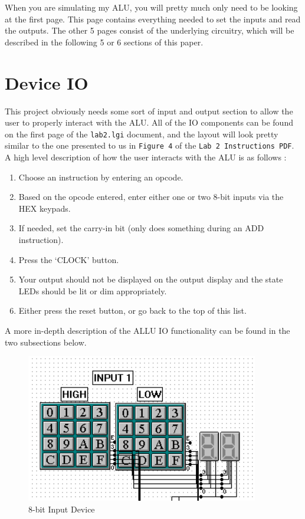 \documentclass[a4paper,11pt]{article}
\begin{document}
When you are simulating my ALU, you will pretty much only need to be looking at the first page. This page contains everything needed to set the inputs and read the outputs. The other 5 pages consist of the underlying circuitry, which will be described in the following 5 or 6 sections of this paper.

\section{Device IO}
This project obviously needs some sort of input and output section to allow the user to properly interact with the ALU. All of the IO components can be found on the first page of the \texttt{lab2.lgi} document, and the layout will look pretty similar to the one presented to us in \texttt{Figure 4} of the \texttt{Lab 2 Instructions PDF}. A high level description of how the user interacts with the ALU is as follows :
\begin{enumerate}
\item Choose an instruction by entering an opcode. 
\item Based on the opcode entered, enter either one or two 8-bit inputs via the HEX keypads. 
\item If needed, set the carry-in bit (only does something during an ADD instruction).
\item Press the `CLOCK' button. 
\item Your output should not be displayed on the output display and the state LEDs should be lit or dim appropriately.
\item Either press the reset button, or go back to the top of this list.
\end{enumerate}

A more in-depth description of the ALLU IO functionality can be found in the two subsections below.

  \begin{figure}
       \includegraphics[width=4in]{pictures/8bitinput}
     \caption{8-bit Input Device}
     \label{fig:8bitinput}
  \end{figure} 
\end{document}
